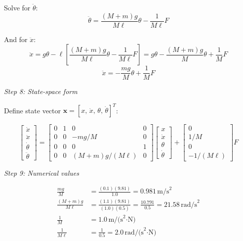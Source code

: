 \begin{example}
Solve for $\ddot{\theta}$:
\begin{equation}
\boxed{\ddot{\theta} = \frac{(M+m)g}{M\ell}\theta - \frac{1}{M\ell}F}
\end{equation}

And for $\ddot{x}$:
\begin{equation}
\ddot{x} = g\theta - \ell\left[\frac{(M+m)g}{M\ell}\theta - \frac{1}{M\ell}F\right] = g\theta - \frac{(M+m)g}{M}\theta + \frac{1}{M}F
\end{equation}
\begin{equation}
\boxed{\ddot{x} = -\frac{mg}{M}\theta + \frac{1}{M}F}
\end{equation}

\textit{Step 8: State-space form}

Define state vector $\mathbf{x} = [x,\, \dot{x},\, \theta,\, \dot{\theta}]^T$:

\begin{equation}
\begin{bmatrix}
\dot{x} \\
\ddot{x} \\
\dot{\theta} \\
\ddot{\theta}
\end{bmatrix}
=
\begin{bmatrix}
0 & 1 & 0 & 0 \\
0 & 0 & -mg/M & 0 \\
0 & 0 & 0 & 1 \\
0 & 0 & (M+m)g/(M\ell) & 0
\end{bmatrix}
\begin{bmatrix}
x \\
\dot{x} \\
\theta \\
\dot{\theta}
\end{bmatrix}
+
\begin{bmatrix}
0 \\
1/M \\
0 \\
-1/(M\ell)
\end{bmatrix}
F
\end{equation}

\textit{Step 9: Numerical values}

\begin{align}
\frac{mg}{M} &= \frac{(0.1)(9.81)}{1.0} = 0.981\,\text{m/s}^2 \\
\frac{(M+m)g}{M\ell} &= \frac{(1.1)(9.81)}{(1.0)(0.5)} = \frac{10.791}{0.5} = 21.58\,\text{rad/s}^2 \\
\frac{1}{M} &= 1.0\,\text{m/(s}^2\text{·N)} \\
\frac{1}{M\ell} &= \frac{1}{0.5} = 2.0\,\text{rad/(s}^2\text{·N)}
\end{align}


\end{example}
